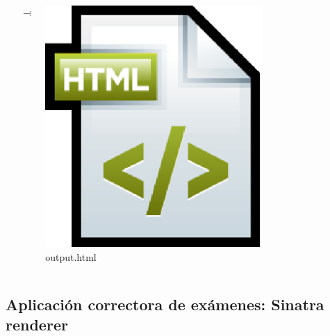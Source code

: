 \documentclass{beamer}
\begin{document}
\begin{frame}[allowframebreaks]
\begin{columns}
\begin{column}{5cm}
\begin{center}
      \end{center}
    \end{column}
    \begin{column}{0.5cm}
      $\rightarrow$
    \end{column}
    \begin{column}{3cm}
      \includegraphics[width=0.7\textwidth]{img/file_html.eps} \\
      output.html
    \end{column}
  \end{columns}
  
\end{frame}
  
\subsection{Aplicación correctora de exámenes: Sinatra renderer}
\end{document}
